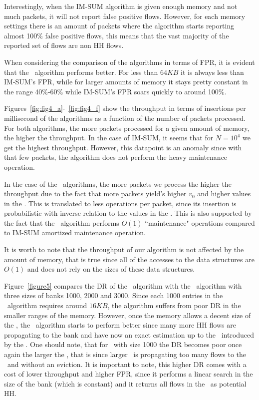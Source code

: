 Interestingly, when the IM-SUM algorithm is given enough memory and not much packets, it will not report false positive flows. However, for each memory settings there is an amount of packets where the algorithm starts reporting almost 100\% false positive flows, this means that the vast majority of the reported set of flows are non HH flows.

When considering the comparison of the algorithms in terms of FPR, it is evident that the \cs\ algorithm performs better. For less than $64KB$ it is always less than IM-SUM's FPR, while for larger amounts of memory it stays pretty constant in the range 40\%-60\% while IM-SUM's FPR soars quickly to around 100\%.



Figures~\ref{fig:fig4_a}-~\ref{fig:fig4_f} show the throughput in terms of insertions per millisecond of the algorithms as a function of the number of packets processed. For both algorithms, the more packets processed for a given amount of memory, the higher the throughput. In the case of IM-SUM, it seems that for $N=10^4$ we get the highest throughput. However, this datapoint is an anomaly since with that few packets, the algorithm does not perform the heavy maintenance operation.

In the case of the \cs\ algorithms, the more packets we process the higher the throughput due to the fact that more packets yield's higher $v_0$ and higher values in the \sea. This is translated to less operations per packet, since its insertion is probabilistic with inverse relation to the values in the \sea. This is also supported by the fact that the \cs\ algorithm performs $O(1)$ ``maintenance" operations compared to IM-SUM amortized maintenance operation.

It is worth to note that the throughput of our algorithm is not affected by the amount of memory, that is true since all of the accesses to the data structures are $O(1)$ and does not rely on the sizes of these data structures.



Figure~\ref{figure5} compares the DR of the \cs\ algorithm with the \eb\ algorithm with three sizes of banks 1000, 2000 and 3000. Since each 1000 entries in the \eb\ algorithm requires around $16KB$, the algorithm suffers from poor DR in the smaller ranges of the memory. However, once the memory allows a decent size of the \sfa, the \eb\ algorithm starts to perform better since many more HH flows are propagating to the bank and have now an exact estimation up to the \pe\ introduced by the \sfa. One should note, that for \eb\ with size 1000 the DR becomes poor once again the larger the \sfa, that is since larger \sfa\ is propagating too many flows to the \eb\ and without an eviction. It is important to note, this higher DR comes with a cost of lower throughput and higher FPR, since it performs a linear search in the size of the bank (which is constant) and it returns all flows in the \eb\ as potential HH.